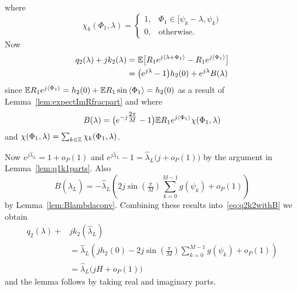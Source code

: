 \documentclass[draftcls, onecolumn, 11pt]{IEEEtran}
\begin{document}
\begin{IEEEproof}
where 
\[
\chi_k(\Phi_1,\lambda) = \begin{cases}
1, & \Phi_1 \in [\psi_{k} - \lambda, \psi_k)  \\
0, & \text{otherwise}.
\end{cases}
\]
Now
\begin{align}
q_2(\lambda) + j k_2(\lambda) &= {\mathbb E}\big[ R_1 e^{j\left\langle \lambda + \Phi_1 \right\rangle} - R_1 e^{j\left\langle \Phi_1 \right\rangle}  \big] \nonumber \\
&= \big(e^{j\lambda} - 1 \big) h_2(0)  + e^{j\lambda} B(\lambda) \label{eq:q2k2withB}
\end{align}
since ${\mathbb E} R_1 e^{j\left\langle \Phi_1 \right\rangle} = h_2(0) + {\mathbb E} R_1 \sin\left\langle \Phi_1 \right\rangle = h_2(0)$ as a result of Lemma~\ref{lem:expectImRfracpart} and where
\begin{equation}\label{eq:Blambdadefn}
B(\lambda) = \big( e^{-j\tfrac{2\pi}{M}} - 1 \big){\mathbb E} R_1 e^{j\left\langle \Phi_1 \right\rangle} \chi(\Phi_1,\lambda)
\end{equation}
and $\chi(\Phi_1, \lambda) = \sum_{k \in {\mathbb Z}}\chi_k(\Phi_1, \lambda)$. 

Now $e^{j\hat{\lambda}_L} = 1 + o_P(1)$ and $e^{j\hat{\lambda}_L} - 1 = \hat{\lambda}_L \big( j  + o_P(1) \big)$ by the argument in Lemma~\ref{lem:q1k1parts}.  Also
\[
B(\hat{\lambda}_L) = -\hat{\lambda}_L\left(2j\sin(\tfrac{\pi}{M}) \sum_{k=0}^{M-1} g(\psi_k) + o_P(1)\right) 
\]
by Lemma~\ref{lem:Blambdaconv}.  Combining these results into~\eqref{eq:q2k2withB} we obtain
\begin{align*}
q_2(\lambda) + &jk_2(\hat{\lambda}_L) \\
&= \hat{\lambda}_L \left( jh_2(0) - 2j\sin(\tfrac{\pi}{M}) \sum_{k=0}^{M-1} g(\psi_k) + o_P(1) \right) \\
&= \hat{\lambda}_L\big( jH + o_P(1) \big)
\end{align*}
and the lemma follows by taking real and imaginary parts.
\end{IEEEproof}
\end{document}
